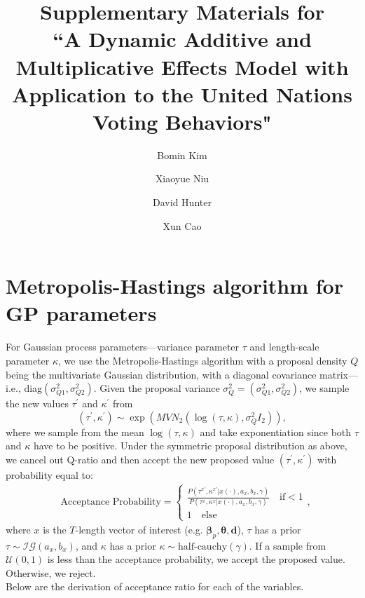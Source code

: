 \documentclass[a4paper]{article}
\title{Supplementary Materials for \\``A Dynamic Additive and Multiplicative Effects Model with Application to the United Nations Voting Behaviors"}
\author[1]{Bomin Kim}
\author[1]{Xiaoyue Niu}
\author[1]{David Hunter}
\author[2]{Xun Cao}
\affil[1]{Department of Statistics, The Pennsylvania State University}
\affil[2]{Department of Political Science, The Pennsylvania State University}
\date{}
\begin{document}
	\maketitle
\section{Metropolis-Hastings algorithm for GP parameters}
For Gaussian process parameters---variance parameter $\tau$ and length-scale parameter $\kappa$, we use the Metropolis-Hastings algorithm with a proposal density $Q$ being the multivariate Gaussian distribution, with a diagonal covariance matrix---i.e., diag$ (\sigma^2_{Q1}, \sigma^2_{Q2})$. Given the proposal variance $\sigma^2_Q = (\sigma^2_{Q1}, \sigma^2_{Q2})$, we sample the new values $\tau^\prime$ and $\kappa^\prime$ from
\begin{equation*}
	(\tau^\prime, \kappa^\prime) \sim \exp(MVN_2(\log(\tau, \kappa), \sigma^2_QI_2)),
\end{equation*}
where we sample from the mean $\log(\tau, \kappa)$ and take exponentiation since both $\tau$ and $\kappa$ have to be positive. 
Under the symmetric proposal distribution as above, we cancel out Q-ratio and then accept the new proposed value $(\tau^\prime, \kappa^\prime)$ with probability equal to:
\begin{equation}
\begin{split}
& \mbox{Acceptance Probability}=
\begin{cases}  \frac{P(\tau^{x\prime}, \kappa^{x\prime}|x(\cdot), a_x, b_x,\gamma)}{P(\tau^{x}, \kappa^{x}|x(\cdot), a_x, b_x,\gamma)}\quad\text{if}  <1\\
1 \quad \text{else}
\end{cases},
\end{split}
\end{equation}
where $x$ is the $T$-length vector of interest (e.g. $\boldsymbol{\beta}_p, \boldsymbol{\theta}, \boldsymbol{d}$), $\tau$ has a prior $\tau \sim \mathcal{IG}(a_x, b_x)$, and $\kappa$ has a prior $\kappa \sim \mbox{half-cauchy}(\gamma)$. If a sample from $\mathcal{U}(0,1)$ is less than the acceptance probability, we accept the proposed value. Otherwise, we reject.\\ \newline
Below are the derivation of acceptance ratio for each of the variables.
\end{document}
